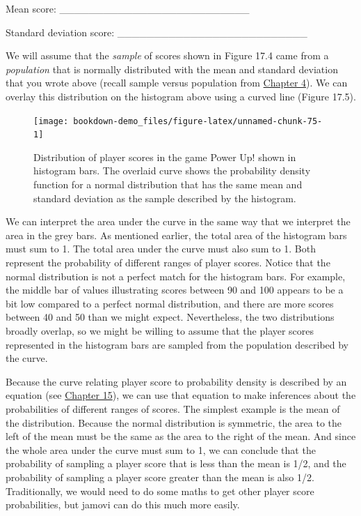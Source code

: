 \documentclass[
]{scrbook}
\begin{document}
Mean score: \_\_\_\_\_\_\_\_\_\_\_\_\_\_\_\_\_\_\_\_\_\_\_\_\_\_

Standard deviation score: \_\_\_\_\_\_\_\_\_\_\_\_\_\_\_\_\_\_\_\_\_\_\_\_\_\_

We will assume that the \emph{sample} of scores shown in Figure 17.4 came from a \emph{population} that is normally distributed with the mean and standard deviation that you wrote above (recall sample versus population from \protect\hyperlink{Chapter_4}{Chapter 4}).
We can overlay this distribution on the histogram above using a curved line (Figure 17.5).

\begin{figure}
\texttt{[image: bookdown-demo\_files/figure-latex/unnamed-chunk-75-1]} \caption{Distribution of player scores in the game Power Up! shown in histogram bars. The overlaid curve shows the probability density function for a normal distribution that has the same mean and standard deviation as the sample described by the histogram.}\label{fig:unnamed-chunk-75}
\end{figure}

We can interpret the area under the curve in the same way that we interpret the area in the grey bars.
As mentioned earlier, the total area of the histogram bars must sum to 1.
The total area under the curve must also sum to 1.
Both represent the probability of different ranges of player scores.
Notice that the normal distribution is not a perfect match for the histogram bars.
For example, the middle bar of values illustrating scores between 90 and 100 appears to be a bit low compared to a perfect normal distribution, and there are more scores between 40 and 50 than we might expect.
Nevertheless, the two distributions broadly overlap, so we might be willing to assume that the player scores represented in the histogram bars are sampled from the population described by the curve.

Because the curve relating player score to probability density is described by an equation (see \protect\hyperlink{Chapter_15}{Chapter 15}), we can use that equation to make inferences about the probabilities of different ranges of scores.
The simplest example is the mean of the distribution.
Because the normal distribution is symmetric, the area to the left of the mean must be the same as the area to the right of the mean.
And since the whole area under the curve must sum to 1, we can conclude that the probability of sampling a player score that is less than the mean is 1/2, and the probability of sampling a player score greater than the mean is also 1/2.
Traditionally, we would need to do some maths to get other player score probabilities, but jamovi can do this much more easily.
\end{document}
